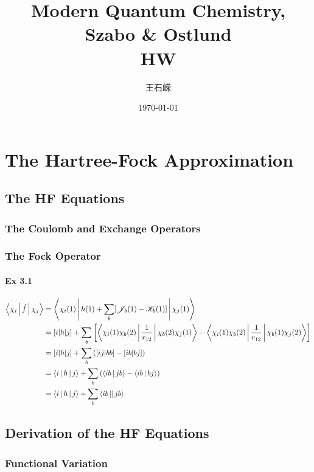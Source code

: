 \documentclass[a4paper]{article}
\title{\textbf{Modern Quantum Chemistry, Szabo \& Ostlund}\\HW}
\author{王石嵘
\vspace{5pt}\\
}
\date{\today} %
\newcommand{\ex}[1]{\paragraph{Ex #1}}
\numberwithin{equation}{subsection}
\begin{document}

\maketitle

\tableofcontents

\newpage

\setcounter{section}{2}
\section{The Hartree-Fock Approximation}
\subsection{The HF Equations}
\subsubsection{The Coulomb and Exchange Operators}
\subsubsection{The Fock Operator}
\ex{3.1}
\begin{align}
\Braket{\chi_i | \hat{f} | \chi_j} &= \Braket{ \chi_i(1) | h(1) + \sum_{b} [\mathscr{J}_b(1) - \mathscr{K}_b(1)] | \chi_j(1)} \notag\\
&= [i|h|j] + \sum_b\qty[\Braket{\chi_i(1) \chi_b(2) | \dfrac{1}{r_{12}} | \chi_b(2)\chi_j(1)} - \Braket{\chi_i(1)\chi_b(2) | \dfrac{1}{r_{12}} | \chi_b(1)\chi_j(2)}] \notag\\
&= [i|h|j] + \sum_b\qty([ij|bb] - [ib|bj]) \notag\\
&= \Braket{i|h|j} + \sum_b\qty(\Braket{ib|jb} - \Braket{ib|bj}) \notag\\
&= \Braket{i|h|j} + \sum_b\Braket{ib||jb}
\end{align}

\subsection{Derivation of the HF Equations}
\subsubsection{Functional Variation}
\end{document}
